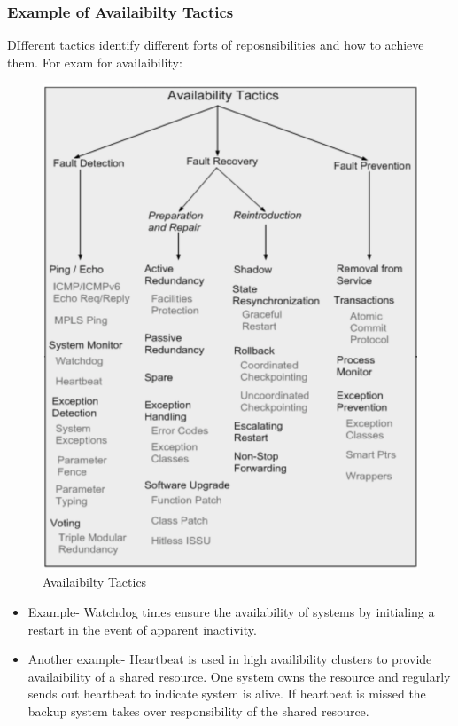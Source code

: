 \documentclass[a4paper]{report}
\begin{document}
\subsubsection*{Example of Availaibilty Tactics}
DIfferent tactics identify different forts of reposnsibilities and how to achieve them. For exam for availaibility: 
\begin{figure}[h]
\centering 
\includegraphics[scale=0.3]{aimages/availaibilitytactic.png}
\caption{\label{tab:widgets}Availaibilty Tactics}
\end{figure}

\begin{itemize}
\item Example- Watchdog times ensure the availability of systems by initialing a restart in the event of apparent inactivity.
\item Another example- Heartbeat is used in high availibility clusters to provide availaibility of a shared resource. One system owns the resource and regularly sends out heartbeat to indicate system is alive. If heartbeat is missed the backup system takes over responsibility of the shared resource.
\end{itemize}
\end{document}
